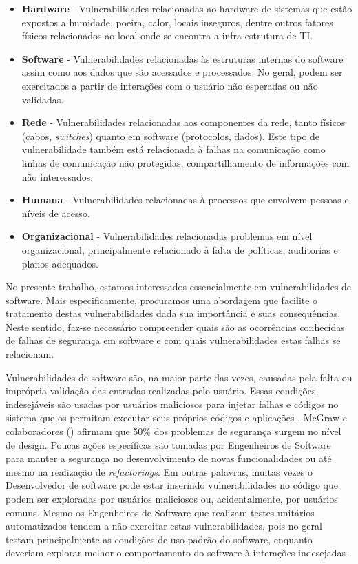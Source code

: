 \begin{itemize}
\item \textbf{Hardware} - Vulnerabilidades relacionadas ao hardware de sistemas que estão expostos a humidade, poeira, calor, locais inseguros, dentre outros fatores físicos relacionados ao local onde se encontra a infra-estrutura de TI.
\item \textbf{Software} - Vulnerabilidades relacionadas às estruturas internas do software assim como aos dados que são acessados e processados. No geral, podem ser exercitados a partir de interações com o usuário não esperadas ou não validadas.
\item \textbf{Rede} - Vulnerabilidades relacionadas aos componentes da rede, tanto físicos (cabos, \emph{switches}) quanto em software (protocolos, dados). Este tipo de vulnerabilidade também está relacionada à falhas na comunicação como linhas de comunicação não protegidas, compartilhamento de informações com não interessados.
\item \textbf{Humana} - Vulnerabilidades relacionadas à processos que envolvem pessoas e níveis de acesso.
\item \textbf{Organizacional} - Vulnerabilidades relacionadas problemas em nível organizacional, principalmente relacionado à falta de políticas, auditorias e planos adequados.
\end{itemize}

%

No presente trabalho, estamos interessados essencialmente em vulnerabilidades de software. Mais especificamente, procuramos uma abordagem que facilite o tratamento destas vulnerabilidades dada sua importância e suas consequências. Neste sentido, faz-se necessário compreender quais são as ocorrências conhecidas de falhas de segurança em software e com quais vulnerabilidades estas falhas se relacionam.

%

Vulnerabilidades de software são, na maior parte das vezes, causadas pela falta ou imprópria validação das entradas realizadas pelo usuário. Essas condições indesejáveis são usadas por usuários maliciosos para injetar falhas e códigos no sistema que os permitam executar seus próprios códigos e aplicações  \cite{jimenez2009}. McGraw e colaboradores (\citeyear{mcgraw2004}) afirmam que 50\% dos problemas de segurança surgem no nível de design. Poucas ações específicas são tomadas por Engenheiros de Software para manter a segurança no desenvolvimento de novas funcionalidades ou até mesmo na realização de \emph{refactorings}. Em outras palavras, muitas vezes o Desenvolvedor de software pode estar inserindo vulnerabilidades no código que podem ser exploradas por usuários maliciosos ou, acidentalmente, por usuários comuns. Mesmo os Engenheiros de Software que realizam testes unitários automatizados tendem a não exercitar estas vulnerabilidades, pois no geral testam principalmente as condições de uso padrão do software, enquanto deveriam explorar melhor o comportamento do software à interações indesejadas \cite{vries2006}.

